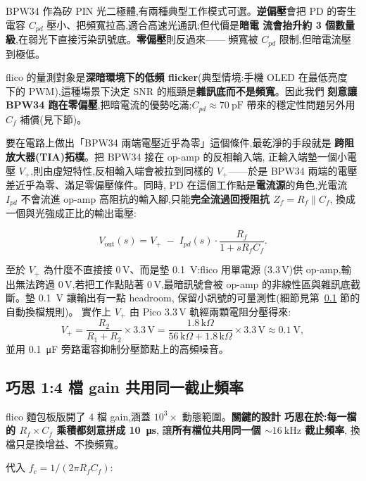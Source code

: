 \documentclass[12pt,a4paper]{article}
\begin{document}
BPW34 作為矽 PIN 光二極體,有兩種典型工作模式可選。\textbf{逆偏壓}會把 PD
的寄生電容 \(C_{pd}\) 壓小、把頻寬拉高,適合高速光通訊;但代價是\textbf{暗電
	流會抬升約 3 個數量級},在弱光下直接污染訊號底。\textbf{零偏壓}則反過來——
頻寬被 \(C_{pd}\) 限制,但暗電流壓到極低。

flico 的量測對象是\textbf{深暗環境下的低頻 flicker}(典型情境:手機 OLED 在最低亮度
下的 PWM),這種場景下決定 SNR 的瓶頸是\textbf{雜訊底而不是頻寬}。因此我們
\textbf{刻意讓 BPW34 跑在零偏壓},把暗電流的優勢吃滿;\(C_{pd} \approx
\SI{70}{\pico\farad}\) 帶來的穩定性問題另外用 \(C_f\) 補償(見下節)。

要在電路上做出「BPW34 兩端電壓近乎為零」這個條件,最乾淨的手段就是
\textbf{跨阻放大器(TIA)拓樸}。把 BPW34 接在 op-amp 的反相輸入端,
正輸入端墊一個小電壓 \(V_{+}\),則由虛短特性,反相輸入端會被拉到同樣的
\(V_{+}\)——於是 BPW34 兩端的電壓差近乎為零、滿足零偏壓條件。同時,
PD 在這個工作點是\textbf{電流源}的角色,光電流 \(I_{pd}\) 不會流進 op-amp
高阻抗的輸入腳,只能\textbf{完全流過回授阻抗 \(Z_f = R_f \parallel C_f\)},
換成一個與光強成正比的輸出電壓:

\begin{equation}
	V_\text{out}(s) = V_{+} \;-\; I_{pd}(s) \cdot \frac{R_f}{1 + sR_fC_f}.
	\label{eq:tia-tf}
\end{equation}

至於 \(V_{+}\) 為什麼不直接接 0\,V、而是墊 \SI{0.1}{\volt}:flico 用單電源
(3.3\,V)供 op-amp,輸出無法跨過 0\,V,若把工作點貼著 0\,V,最暗訊號會被
op-amp 的非線性區與雜訊底截斷。墊 \SI{0.1}{\volt} 讓輸出有一點 headroom,
保留小訊號的可量測性(細節見第~\ref{sec:gain-table} 節的自動換檔規則)。
實作上 \(V_{+}\) 由 Pico 3.3\,V 軌經兩顆電阻分壓得來:
\[
	V_{+} = \frac{R_2}{R_1 + R_2}\times 3.3\,\text{V}
	= \frac{1.8\,\text{k}\Omega}{56\,\text{k}\Omega + 1.8\,\text{k}\Omega}\times 3.3\,\text{V}
	\approx \SI{0.1}{\volt},
\]
並用 \SI{0.1}{\micro\farad} 旁路電容抑制分壓節點上的高頻噪音。

\subsection{巧思 1:4 檔 gain 共用同一截止頻率}
\label{sec:gain-table}

flico 麵包板版開了 4 檔 gain,涵蓋 \(10^3 \times\) 動態範圍。\textbf{關鍵的設計
	巧思在於:每一檔的 \(R_f \times C_f\) 乘積都刻意拼成 \SI{10}{\micro\second}},
讓\textbf{所有檔位共用同一個 \(\sim \SI{16}{\kilo\hertz}\) 截止頻率},
換檔只是換增益、不換頻寬。

代入 \(f_c = 1/(2\pi R_f C_f)\):
\end{document}
